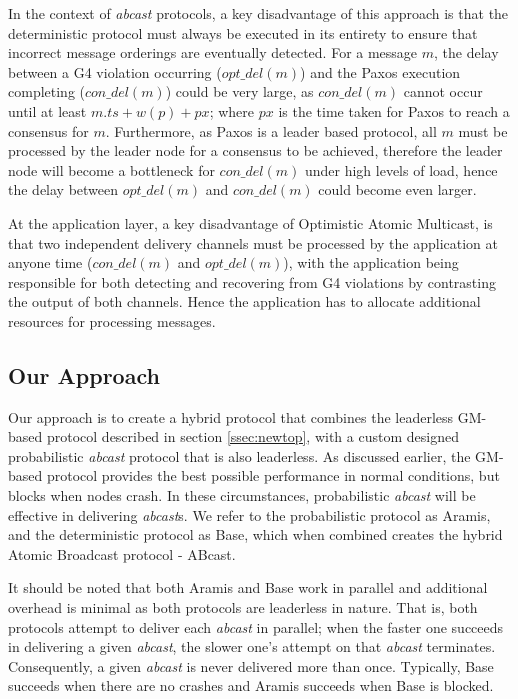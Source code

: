     In the context of \emph{abcast} protocols, a key disadvantage of this approach is that the deterministic protocol must always be executed in its entirety to ensure that incorrect message orderings are eventually detected.  For a message $m$, the delay between a G4 violation occurring ($opt\_del(m)$) and the Paxos execution completing ($con\_del(m)$) could be very large, as $con\_del(m)$ cannot occur until at least $m.ts + w(p) + px$; where $px$ is the time taken for Paxos to reach a consensus for $m$.   Furthermore, as Paxos is a leader based protocol, all $m$ must be processed by the leader node for a consensus to be achieved, therefore the leader node will become a bottleneck for $con\_del(m)$ under high levels of load, hence the delay between $opt\_del(m)$ and $con\_del(m)$ could become even larger.      
    
    At the application layer, a key disadvantage of Optimistic Atomic Multicast, is that two independent delivery channels must be processed by the application at anyone time ($con\_del(m)$ and $opt\_del(m)$), with the application being responsible for both detecting and recovering from G4 violations by contrasting the output of both channels.  Hence the application has to allocate additional resources for processing messages.  
    
    \subsection{Our Approach}
    Our approach is to create a hybrid protocol that combines the leaderless GM-based protocol described in section \ref{ssec:newtop}, with a custom designed probabilistic \emph{abcast} protocol that is also leaderless.  As discussed earlier, the GM-based protocol provides the best possible performance in normal conditions, but blocks when nodes crash.  In these circumstances, probabilistic \emph{abcast} will be effective in delivering \emph{abcast}s. We refer to the probabilistic protocol as \textsf{Aramis}, and the deterministic protocol as \textsf{Base}, which when combined creates the hybrid Atomic Broadcast protocol - \textsf{ABcast}.  
    
    It should be noted that both \textsf{Aramis} and \textsf{Base} work in parallel and additional overhead is minimal as both protocols are leaderless in nature.  That is, both protocols attempt to deliver each \emph{abcast} in parallel; when the faster one succeeds in delivering a given \emph{abcast}, the slower one's attempt on that \emph{abcast} terminates.  Consequently, a given \emph{abcast} is never delivered more than once.  Typically, \textsf{Base} succeeds when there are no crashes and \textsf{Aramis} succeeds when \textsf{Base} is blocked.  
    

